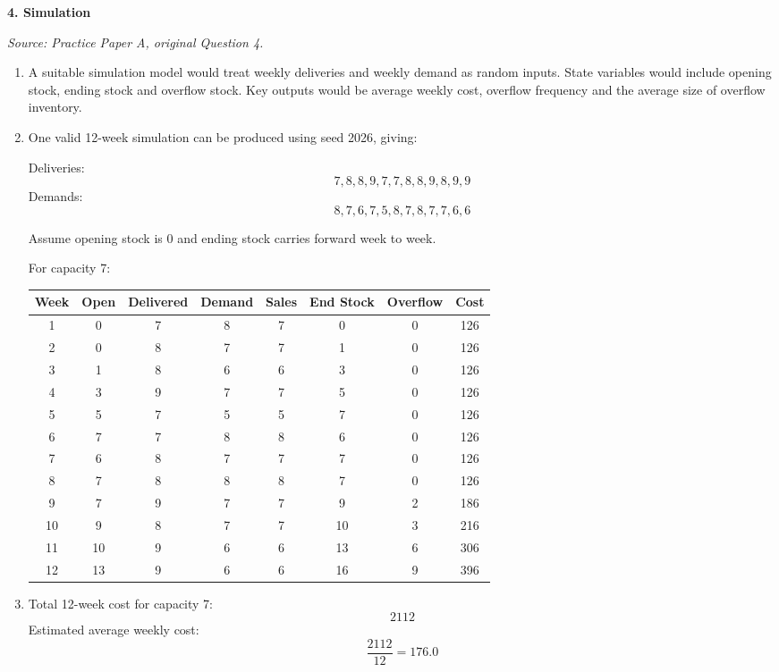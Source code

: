 \documentclass[11pt,a4paper]{article}
\begin{document}
\newpage

\textbf{4. Simulation}

\textit{Source: Practice Paper A, original Question 4.}



\begin{enumerate}
\item A suitable simulation model would treat weekly deliveries and weekly demand as random inputs. State variables would include opening stock, ending stock and overflow stock. Key outputs would be average weekly cost, overflow frequency and the average size of overflow inventory.

\item One valid 12-week simulation can be produced using seed 2026, giving:

Deliveries:
\[
7,8,8,9,7,7,8,8,9,8,9,9
\]
Demands:
\[
8,7,6,7,5,8,7,8,7,7,6,6
\]

Assume opening stock is 0 and ending stock carries forward week to week.

For capacity 7:

\begin{center}
\begin{tabular}{cccccccc}
\toprule
Week & Open & Delivered & Demand & Sales & End Stock & Overflow & Cost \\
\midrule
1 & 0 & 7 & 8 & 7 & 0 & 0 & 126 \\
2 & 0 & 8 & 7 & 7 & 1 & 0 & 126 \\
3 & 1 & 8 & 6 & 6 & 3 & 0 & 126 \\
4 & 3 & 9 & 7 & 7 & 5 & 0 & 126 \\
5 & 5 & 7 & 5 & 5 & 7 & 0 & 126 \\
6 & 7 & 7 & 8 & 8 & 6 & 0 & 126 \\
7 & 6 & 8 & 7 & 7 & 7 & 0 & 126 \\
8 & 7 & 8 & 8 & 8 & 7 & 0 & 126 \\
9 & 7 & 9 & 7 & 7 & 9 & 2 & 186 \\
10 & 9 & 8 & 7 & 7 & 10 & 3 & 216 \\
11 & 10 & 9 & 6 & 6 & 13 & 6 & 306 \\
12 & 13 & 9 & 6 & 6 & 16 & 9 & 396 \\
\bottomrule
\end{tabular}
\end{center}

\item Total 12-week cost for capacity 7:
\[
2112
\]
Estimated average weekly cost:
\[
\frac{2112}{12}=176.0
\]


\end{enumerate}
\end{document}

